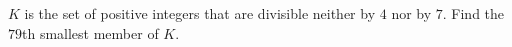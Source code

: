 $K$ is the set of positive integers that are divisible neither by $4$ nor by $7$. Find the $79$th smallest member of $K$.
